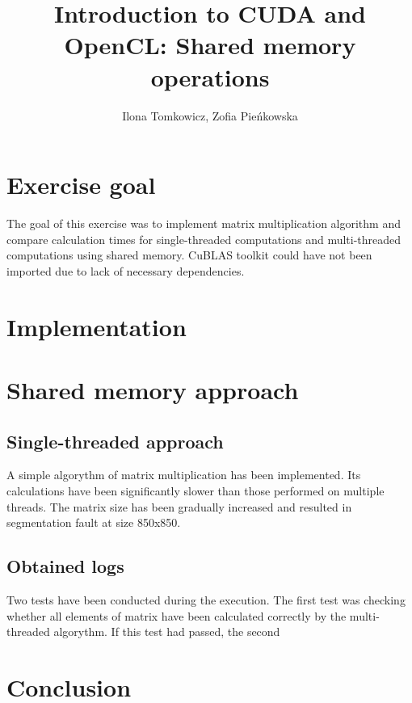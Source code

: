 \documentclass[12pt]{article}
\begin{document}
\title{Introduction to CUDA and OpenCL: Shared memory operations}
\author{Ilona Tomkowicz, Zofia Pieńkowska}

\maketitle
\tableofcontents
\newpage

\section{Exercise goal}
The goal of this exercise was to implement matrix multiplication algorithm and compare calculation times for single-threaded computations and multi-threaded computations using shared memory. CuBLAS toolkit could have not been imported due to lack of necessary dependencies.

\section{Implementation}

\section{Shared memory approach}


\subsection{Single-threaded approach}
A simple algorythm of matrix multiplication has been implemented. Its calculations have been significantly slower than those performed on multiple threads. The matrix size has been gradually increased and resulted in segmentation fault at size 850x850.

\subsection{Obtained logs}
Two tests have been conducted during the execution. The first test was checking whether all elements of matrix have been calculated correctly by the multi-threaded algorythm. If this test had passed, the second

\section{Conclusion}
\end{document}
